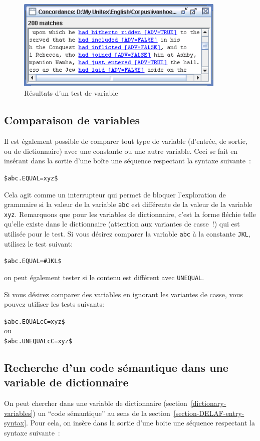 \begin{figure}[!ht]
\begin{center}
\includegraphics[width=10cm]{resources/img/fig6-29c.png}
\caption{Résultats d'un test de variable\label{fig-testing-a-variable-results}}
\end{center}
\end{figure}


\subsection{Comparaison de variables}
Il est également possible de comparer tout type de variable (d'entrée, de sortie, ou de dictionnaire) avec une constante ou une autre variable. Ceci se fait en insérant dans la sortie d'une boîte une séquence respectant la syntaxe suivante~:


\bigskip
\noindent \verb+$abc.EQUAL=xyz$+

\bigskip
\noindent Cela agit comme un interrupteur qui permet de bloquer l'exploration de grammaire si la valeur de la variable \verb+abc+ est différente de la valeur de la variable \verb+xyz+. Remarquons que pour les variables de dictionnaire, c'est la forme fléchie telle qu'elle existe dans le dictionnaire (attention aux variantes de casse~!) qui est utilisée pour le test. Si vous désirez comparer la variable \verb+abc+ à la constante \verb+JKL+, utilisez le test suivant:

\bigskip
\noindent \verb+$abc.EQUAL=#JKL$+

\bigskip
\noindent on peut également tester si le contenu est différent avec \verb+UNEQUAL+.

\bigskip
\noindent Si vous désirez comparer des variables en ignorant les variantes de casse, vous pouvez
utiliser les tests suivants:

\bigskip
\noindent \verb+$abc.EQUALcC=xyz$+ \\
ou \\
\verb+$abc.UNEQUALcC=xyz$+

\subsection{Recherche d'un code sémantique dans une variable de dictionnaire}
On peut chercher dans une variable de dictionnaire 
(section~\ref{dictionary-variables}) un ``code sémantique'' au sens de la section~\ref{section-DELAF-entry-syntax}.
Pour cela, on insère dans la sortie d'une boite une séquence respectant la syntaxe suivante~:

